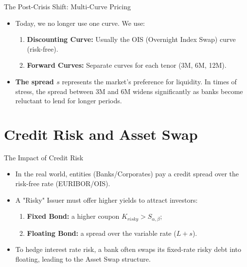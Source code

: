 \documentclass{beamer}
\begin{document}
\begin{frame}{The Post-Crisis Shift: Multi-Curve Pricing}
	\begin{itemize}
		\item Today, we no longer use one curve. We use:
		\begin{enumerate}
			\item \textbf{Discounting Curve:} Usually the OIS (Overnight Index Swap) curve (risk-free).
			\item \textbf{Forward Curves:} Separate curves for each tenor (3M, 6M, 12M).
		\end{enumerate}
		\item \textbf{The spread $s$} represents the market's preference for liquidity. In times of stress, the spread between 3M and 6M widens significantly as banks become reluctant to lend for longer periods.
	\end{itemize}

\end{frame}

\section{Credit Risk and Asset Swap}

\begin{frame}{The Impact of Credit Risk}
	\begin{itemize}
		\item In the real world, entities (Banks/Corporates) pay a \textcolor{maincolor}{credit spread} over the risk-free rate (EURIBOR/OIS).
		\item A "Risky" Issuer must offer higher yields to attract investors:
		\begin{enumerate}
			\item \textbf{Fixed Bond:} a higher coupon $K_{risky} > S_{\alpha,\beta}$;
			\item \textbf{Floating Bond:} a spread over the variable rate ($L+s$).
		\end{enumerate}
		\item To hedge interest rate risk, a bank often swaps its fixed-rate risky debt into floating, leading to the Asset Swap structure.
	\end{itemize}
\end{frame}
\end{document}
